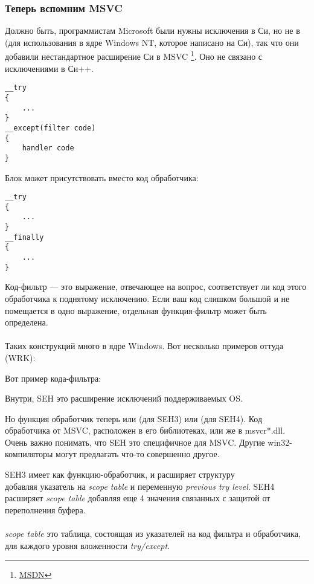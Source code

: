 \subsubsection{Теперь вспомним MSVC}

Должно быть, программистам Microsoft были нужны исключения в Си, но не в \Cpp (для использования в ядре Windows NT, которое написано на Си),
так что они добавили нестандартное расширение Си в MSVC
\footnote{\href{http://go.yurichev.com/17057}{MSDN}}.
Оно не связано с исключениями в Си++.

\begin{lstlisting}[style=customc]
__try
{
    ...
}
__except(filter code)
{
    handler code
}
\end{lstlisting}

Блок  может присутствовать вместо код обработчика:

\begin{lstlisting}[style=customc]
__try
{
    ...
}
__finally
{
    ...
}
\end{lstlisting}

Код-фильтр --- это выражение, отвечающее на вопрос, соответствует ли код этого обработчика к поднятому исключению.
Если ваш код слишком большой и не помещается в одно выражение, отдельная функция-фильтр может быть определена.\\
\\
Таких конструкций много в ядре Windows.
Вот несколько примеров оттуда (\ac{WRK}):





Вот пример кода-фильтра:



Внутри, SEH это расширение исключений поддерживаемых OS.

Но функция обработчик теперь или  (для SEH3) или  (для SEH4).
Код обработчика от MSVC, расположен в его библиотеках, или же в  msvcr*.dll.
Очень важно понимать, что SEH это специфичное для MSVC.
Другие win32-компиляторы могут предлагать что-то совершенно другое.


SEH3 имеет  как функцию-обработчик, и расширяет структуру \\
 добавляя указатель на \emph{scope table}
и переменную \emph{previous try level}.
SEH4 расширяет \emph{scope table} добавляя еще 4 значения связанных с защитой от переполнения буфера.\\
\\
\emph{scope table} это таблица, состоящая из указателей на код фильтра и обработчика, для каждого уровня вложенности \emph{try/except}.

